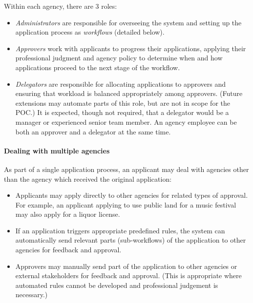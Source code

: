 \documentclass[12pt,a4paper,twosided]{article}
\begin{document}
Within each agency, there are 3 roles:

\begin{itemize}
\itemsep1pt\parskip0pt
\item
  \emph{Administrators} are responsible for overseeing the system and
  setting up the application process as \emph{workflows} (detailed
  below).
\item
  \emph{Approvers} work with applicants to progress their applications,
  applying their professional judgment and agency policy to determine
  when and how applications proceed to the next stage of the workflow.
\item
  \emph{Delegators} are responsible for allocating applications to
  approvers and ensuring that workload is balanced appropriately among
  approvers. (Future extensions may automate parts of this role, but are
  not in scope for the POC.) It is expected, though not required, that a
  delegator would be a manager or experienced senior team member. An
  agency employee can be both an approver and a delegator at the same
  time.
\end{itemize}

\paragraph{Dealing with multiple
agencies}\label{dealing-with-multiple-agencies}

As part of a single application process, an applicant may deal with
agencies other than the agency which received the original application:

\begin{itemize}
\itemsep1pt\parskip0pt
\item
  Applicants may apply directly to other agencies for related types of
  approval. For example, an applicant applying to use public land for a
  music festival may also apply for a liquor license.
\item
  If an application triggers appropriate predefined rules, the system
  can automatically send relevant parts (sub-workflows) of the
  application to other agencies for feedback and approval.
\item
  Approvers may manually send part of the application to other agencies
  or external stakeholders for feedback and approval. (This is
  appropriate where automated rules cannot be developed and professional
  judgement is necessary.)
\end{itemize}
\end{document}
